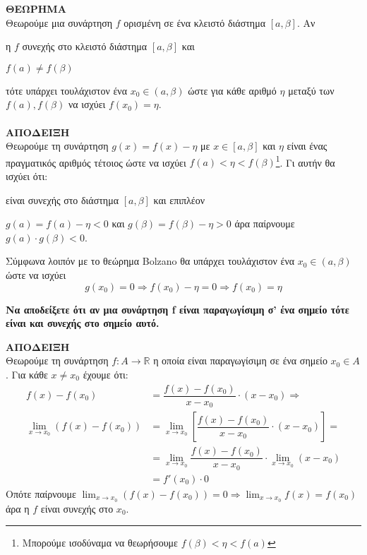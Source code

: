 \documentclass[twoside,nofonts,ektypwsh,math,spyros]{frontisthrio}
\newcounter{Thewrhmabox}[section]
\renewcommand{\theThewrhmabox}{\arabic{Thewrhmabox}}
\newenvironment{Thewrhmabox}[2][\linewidth]
{\refstepcounter{Thewrhmabox}
\begin{tcolorbox}[breakable,
enhanced standard,
boxrule=0.7pt,titlerule=-.2pt,
width=\linewidth,
title style={color=white},
overlay unbroken and first={
\path[left color=\xrwma!20,right color=white,draw=black]
([yshift=-\pgflinewidth]frame.north west) to ([yshift=-5pt]title.south west)[rounded corners=2pt] -- ([xshift=-#2-15pt,yshift=-5pt]title.south east) to[rounded corners=2pt] ([xshift=-#2,yshift=-\pgflinewidth]frame.north east) -- cycle;
},
fonttitle=\bfseries,
before=\par\medskip\noindent,
after=\par\medskip,
toptitle=3pt,
top=11pt,topsep at break=-5pt,
colback=white,title={\scfont\large Θεώρημα \theThewrhmabox} : {\textcolor{black}{\scfont #1}}]}
{\end{tcolorbox}}
\begin{document}
\textbf{ΘΕΩΡΗΜΑ}\\
Θεωρούμε μια συνάρτηση $f$ ορισμένη σε ένα κλειστό διάστημα $[a,\beta]$. Αν
\begin{rlist}
\item η $f$ συνεχής στο κλειστό διάστημα $[a,\beta]$ και 
\item $f(a)\neq f(\beta)$
\end{rlist}
τότε υπάρχει τουλάχιστον ένα $ x_0\in(a,\beta) $ ώστε για κάθε αριθμό $ \eta $ μεταξύ των $ f(a),f(\beta) $ να ισχύει $ f(x_0)=\eta $.\\\\
\textbf{\scfont ΑΠΟΔΕΙΞΗ}\\
Θεωρούμε τη συνάρτηση $ g(x)=f(x)-\eta $ με $ x\in[a,\beta] $ και $ \eta $ είναι ένας πραγματικός αριθμός τέτοιος ώστε να ισχύει $ f(a)<\eta<f(\beta) $\footnote{Μπορούμε ισοδύναμα να θεωρήσουμε $ f(\beta)<\eta<f(a) $}. Γι αυτήν θα ισχύει ότι:
\begin{rlist}
\item είναι συνεχής στο διάστημα $ [a,\beta] $ και επιπλέον
\item $ g(a)=f(a)-\eta<0 $ και $ g(\beta)=f(\beta)-\eta>0 $ άρα παίρνουμε $ g(a)\cdot g(\beta)<0 $.
\end{rlist}
Σύμφωνα λοιπόν με το θεώρημα Bolzano θα υπάρχει τουλάχιστον ένα $ x_0\in(a,\beta) $ ώστε να ισχύει \[ g(x_0)=0\Rightarrow f(x_0)-\eta=0\Rightarrow f(x_0)=\eta \]
\begin{Thewrhmabox}[Παραγωγίσιμη \bmath{$ \Rightarrow $} Συνεχής - Σελ. 217]{7cm}
\textbf{Να αποδείξετε ότι αν μια συνάρτηση f είναι παραγωγίσιμη σ’ ένα σημείο  τότε είναι και συνεχής στο σημείο αυτό. }
\end{Thewrhmabox}
\textbf{\scfont ΑΠΟΔΕΙΞΗ}\\
Θεωρούμε τη συνάρτηση $ f:A\to\mathbb{R} $ η οποία είναι παραγωγίσιμη σε ένα σημείο $ x_0\in A $. Για κάθε $ x\neq x_0 $ έχουμε ότι:
\begin{align*}
f(x)-f(x_0)&=\dfrac{f(x)-f(x_0)}{x-x_0}\cdot (x-x_0)\Rightarrow\\
\lim_{x\to x_0}{\left( f(x)-f(x_0)\right) }&=\lim_{x\to x_0}{\left[
\dfrac{f(x)-f(x_0)}{x-x_0}\cdot (x-x_0)\right]}=\\
&=\lim_{x\to x_0}{
\dfrac{f(x)-f(x_0)}{x-x_0}}\cdot \lim_{x\to x_0}{(x-x_0)}\\
&=f'(x_0)\cdot 0
\end{align*}
Οπότε παίρνουμε $ {\displaystyle \lim_{x\to x_0}{\left( f(x)-f(x_0)\right) }=0\Rightarrow \lim_{x\to x_0}{f(x)}=f(x_0)} $ άρα η $ f $ είναι συνεχής στο $ x_0 $.
\end{document}
